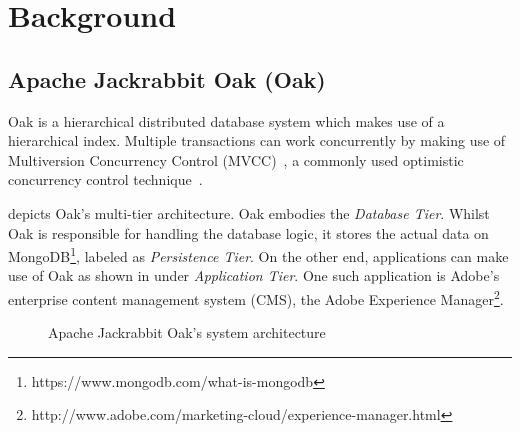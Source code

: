 \documentclass[abstracton,12pt]{scrartcl}
\theoremstyle{definition}
\begin{document}
\section{Background}

\subsection{Apache Jackrabbit Oak (Oak)}

Oak is a hierarchical distributed database system which makes use of a
hierarchical index. Multiple transactions can work concurrently by making use of
Multiversion Concurrency Control (MVCC)~\cite{GW02}, a commonly used optimistic
concurrency control technique~\cite{TM11}.

 depicts Oak's multi-tier architecture. Oak embodies the
\textit{Database Tier}.
Whilst Oak is responsible for handling the database logic, it stores the actual
data on MongoDB\footnote{https://www.mongodb.com/what-is-mongodb}, labeled as
\textit{Persistence Tier}. On the other end, applications can make use of Oak as
shown in  under \textit{Application Tier}.
One such application is Adobe's enterprise content management system (CMS),
the Adobe Experience
Manager\footnote{http://www.adobe.com/marketing-cloud/experience-manager.html}.

\begin{figure}[h]
  \begin{center}
  \end{center}
  \caption{Apache Jackrabbit Oak's system architecture}
  \label{fig:architecture}
\end{figure}
\end{document}
